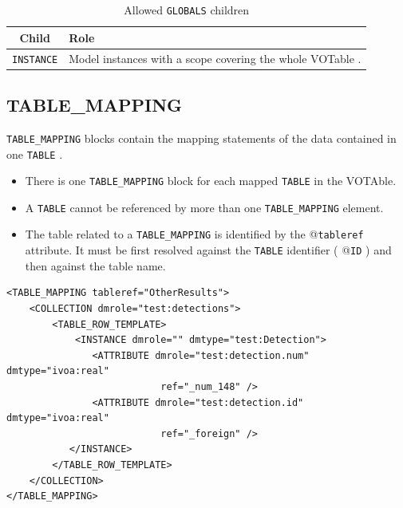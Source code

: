 \documentclass[11pt,a4paper]{ivoa}
\begin{document}
\begin{table}[!h]
\small
\centering
\begin{tabulary}{\linewidth}{|c|J|}       
       \hline 
           \textbf{Child} &  
           \textbf{Role}\\
       \hline         \hline  
            \texttt{INSTANCE}    &  
            Model instances with a scope covering the whole VOTable . \\       
       \hline 
     \end{tabulary}
     \caption{Allowed  \texttt{GLOBALS} children} 
     \label{tbl:globals-children}
 \end{table}


%
%

\subsection{TABLE\_MAPPING}

\texttt{TABLE\_MAPPING} blocks contain the mapping statements of the data contained in one \texttt{TABLE} .

\begin{itemize}
    \item There is one \texttt{TABLE\_MAPPING} block for each mapped \texttt{TABLE}  in the VOTAble.    
    \item A \texttt{TABLE} cannot be referenced by more than one \texttt{TABLE\_MAPPING} element.
    \item The table related to a \texttt{TABLE\_MAPPING} is identified by the @\texttt{tableref} attribute. 
            It must be first resolved against the \texttt{TABLE} identifier ( @\texttt{ID} ) and then against the table name.
\end{itemize}

\begin{lstlisting}[caption={TABLE\_MAPPING block example},style=XML]
<TABLE_MAPPING tableref="OtherResults">
    <COLLECTION dmrole="test:detections">
        <TABLE_ROW_TEMPLATE>
            <INSTANCE dmrole="" dmtype="test:Detection">
               <ATTRIBUTE dmrole="test:detection.num" dmtype="ivoa:real"
                           ref="_num_148" />
               <ATTRIBUTE dmrole="test:detection.id" dmtype="ivoa:real"
                           ref="_foreign" />
           </INSTANCE>
        </TABLE_ROW_TEMPLATE>
    </COLLECTION>
</TABLE_MAPPING>
\end{lstlisting}
\end{document}
